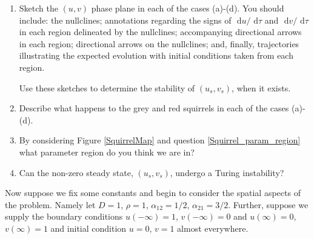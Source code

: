 \documentclass[10pt]{article}
\newcommand{\rd}{\text{ d}}
\newcommand{\fig}[1]{Figure \ref{#1}}
\newcounter{Counter1}
\begin{document}
\begin{enumerate}
\setcounter{enumi}{\value{Counter1}}
\item Sketch the $(u,v)$ phase plane in each of the cases (a)-(d). You should include: the nullclines; annotations regarding the signs of $\rd u/\rd \tau$ and $\rd v/\rd \tau$ in each region delineated by the nullclines; accompanying directional arrows in each region; directional arrows on the nullclines; and, finally, trajectories illustrating the expected evolution with initial conditions taken from each region.

Use these sketches to determine the stability of $(u_s,v_s)$, when it exists.
\item Describe what happens to the grey and red squirrels in each of the cases (a)-(d).\label{Squirrel_param_region}

\item By considering \fig{SquirrelMap} and question \ref{Squirrel_param_region} what parameter region do you think we are in?

\item Can the non-zero steady state, $(u_s,v_s)$, undergo a Turing instability?
\setcounter{Counter1}{\value{enumi}}
\end{enumerate}

Now suppose we fix some constants and begin to consider the spatial aspects of the problem. Namely let $D=1$, $\rho=1$, $\alpha_{12}=1/2$, $\alpha_{21}=3/2$.  Further, suppose we supply the boundary conditions $u(-\infty)=1$, $v(-\infty)=0$ and $u(\infty)=0$, $v(\infty)=1$ and initial condition $u=0$, $v=1$ almost everywhere.
\end{document}
